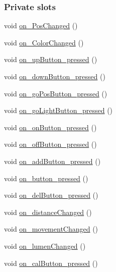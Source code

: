 \subsubsection*{Private slots}
\begin{DoxyCompactItemize}
\item 
void \hyperlink{class_main_display_a123b3d77e3bee2ee148d8e018c8fc35f}{on\+\_\+\+Pos\+Changed} ()
\item 
void \hyperlink{class_main_display_a52b87d1c28a3d284b47c2173fcc35f8e}{on\+\_\+\+Color\+Changed} ()
\item 
void \hyperlink{class_main_display_a9320639a3326230a7d8db24fa7171da4}{on\+\_\+up\+Button\+\_\+pressed} ()
\item 
void \hyperlink{class_main_display_a6c538b96e5bedc28eb06c557811b90be}{on\+\_\+down\+Button\+\_\+pressed} ()
\item 
void \hyperlink{class_main_display_a27f2ff12f69b04285d591a1933ee833e}{on\+\_\+go\+Pos\+Button\+\_\+pressed} ()
\item 
void \hyperlink{class_main_display_a627343d5a2d3faaaf356cc392ff3724c}{on\+\_\+go\+Light\+Button\+\_\+pressed} ()
\item 
void \hyperlink{class_main_display_aa72936be857d483be39f483e47067b75}{on\+\_\+on\+Button\+\_\+pressed} ()
\item 
void \hyperlink{class_main_display_a95c8436a234c95a8c990fe7823d8ebb6}{on\+\_\+off\+Button\+\_\+pressed} ()
\item 
void \hyperlink{class_main_display_acae8720b3bcb65341b5ae4d86e9ffa20}{on\+\_\+add\+Button\+\_\+pressed} ()
\item 
void \hyperlink{class_main_display_a69141f747223994d2d255f1fe23b58f6}{on\+\_\+button\+\_\+pressed} ()
\item 
void \hyperlink{class_main_display_a0f2757a17bb77793f0bb4cef1e619965}{on\+\_\+del\+Button\+\_\+pressed} ()
\item 
void \hyperlink{class_main_display_a4b959c3cf5ded11e93a21114ff00aba0}{on\+\_\+distance\+Changed} ()
\item 
void \hyperlink{class_main_display_a1682973e67a6796e43212fd9a7c5b62b}{on\+\_\+movement\+Changed} ()
\item 
void \hyperlink{class_main_display_a103eb76611e18718537d519bfe5df028}{on\+\_\+lumen\+Changed} ()
\item 
void \hyperlink{class_main_display_a6b0c30743c4c4db509af1d7a19da5f0f}{on\+\_\+cal\+Button\+\_\+pressed} ()
\end{DoxyCompactItemize}

